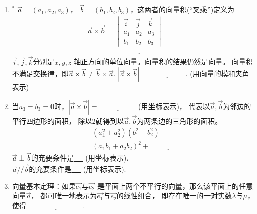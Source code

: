 \documentclass{article}
\newif\ifte
\renewcommand{\vec}{\overrightarrow}
\begin{document}
\begin{multicols}{2}
\begin{enumerate}[leftmargin=20pt]
\item $^*$ $ \vec{a}=(a_1,a_2,a_3) $，
$ \vec{b}=(b_1,b_2,b_3) $，这两者的向量积(“叉乘”)定义为
\begin{align*}
    &\ \vec{a}\times\vec{b} =
    \begin{vmatrix}
        \vec{i} & \vec{j} & \vec{k} \\
        a_1 & a_2 & a_3 \\
        b_1 & b_2 & b_3
    \end{vmatrix} \\
    =&\ \underline{\ \ifte (a_2b_3-a_3b_2,
a_3b_1-a_1b_3, a_1b_2-a_2b_1)\else \hspace{6cm} \fi\ }
\end{align*}
$ \vec{i},\vec{j},\vec{k} $分别是$ x,y,z $
轴正方向的单位向量。向量积的结果仍然是向量。
向量积不满足交换律，即$ \vec{a}\times
\vec{b}\neq \vec{b}\times\vec{a} $.\qquad
$ |\vec{a}\times\vec{b}|=
\underline{\ \ifte |\vec{a}||\vec{b}|\sin\langle
 \vec{a},\vec{b}\rangle\else \hspace{2cm} \fi\ } $.
\ifte \else (用向量的模和夹角表示)\fi

\item 当$ a_3=b_3=0 $时，$ |\vec{a}\times\vec{b}|=
\underline{\ \ifte |a_1b_2-a_2b_1|\else \hspace{2cm} \fi\ } $
\ifte \else (用坐标表示)\fi，
代表以$ \vec{a},\vec{b} $为邻边的平行四边形的面积，
除以2就得到以$ \vec{a},\vec{b} $为两条边的三角形的面积。
\begin{align*}
    &\ (a_1^2+a_2^2)(b_1^2+b_2^2)\\
    =&\ (a_1b_1+a_2b_2)^2+\underline{\ \ifte 
        (a_1b_2-a_2b_1)^2 \else \hspace{2cm} \fi\ }
\end{align*}
$ \vec{a}\perp\vec{b} $的充要条件是\underline{\ \ifte 
    $ a_1b_1+a_2b_2=0 $\else \hspace{2.5cm} \fi\ }
\ifte \else (用坐标表示)\fi. \\
$ \vec{a}//\vec{b} $的充要条件是\underline{\ \ifte 
$ a_1b_2-a_2b_1=0 $\else \hspace{2.5cm} \fi\ }
\ifte \else (用坐标表示)\fi.

\item 向量基本定理：如果$ \vec{e_1} $与$ \vec{e_2} $
是平面上两个不平行的向量，那么该平面上的任意向量$ \vec{a} $，
都可唯一地表示为$ \vec{e_1} $与$ \vec{e_2} $的线性组合，
即存在唯一的一对实数$ \lambda $与$ \mu $，使得
$ \underline{\ \ifte \vec{a}=\lambda \vec{e_1}+
    \mu \vec{e_2}\else \hspace{3cm} \fi\ } $.


\end{enumerate}
\end{multicols}
\end{document}
